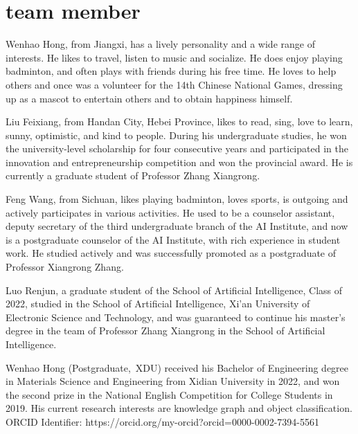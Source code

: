 \documentclass[journal]{IEEEtran}
\begin{document}
\section{team member}

Wenhao Hong, from Jiangxi, has a lively personality and a wide range of interests. He likes to travel, listen to music and socialize. He does enjoy playing badminton, and often plays with friends during his free time. He loves to help others and once was a volunteer for the 14th Chinese National Games, dressing up as a mascot to entertain others and to obtain happiness himself.

Liu Feixiang, from Handan City, Hebei Province, likes to read, sing, love to learn, sunny, optimistic, and kind to people. During his undergraduate studies, he won the university-level scholarship for four consecutive years and participated in the innovation and entrepreneurship competition and won the provincial award. He is currently a graduate student of Professor Zhang Xiangrong.

Feng Wang, from Sichuan, likes playing badminton, loves sports, is outgoing and actively participates in various activities. He used to be a counselor assistant, deputy secretary of the third undergraduate branch of the AI Institute, and now is a postgraduate counselor of the AI Institute, with rich experience in student work. He studied actively and was successfully promoted as a postgraduate of Professor Xiangrong Zhang. 

Luo Renjun, a graduate student of the School of Artificial Intelligence, Class of 2022, studied in the School of Artificial Intelligence, Xi'an University of Electronic Science and Technology, and was guaranteed to continue his master's degree in the team of Professor Zhang Xiangrong in the School of Artificial Intelligence.





\begin{IEEEbiography}{Wenhao Hong}
(Postgraduate,~XDU) received his Bachelor of Engineering degree in Materials Science and Engineering from Xidian University in 2022, and won the second prize in the National English Competition for College Students in 2019. His current research interests are knowledge graph and object classification. ORCID Identifier: https://orcid.org/my-orcid?orcid=0000-0002-7394-5561
\end{IEEEbiography}
\end{document}
